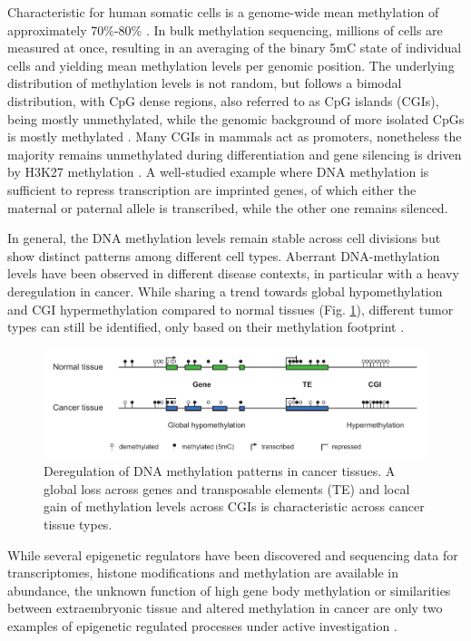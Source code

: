 Characteristic for human somatic cells is a genome-wide mean methylation of approximately 70\%-80\% \cite{Bird2002}.
In bulk methylation sequencing, millions of cells are measured at once, resulting in an averaging of the binary 5mC state of individual cells and yielding mean methylation levels per genomic position.
The underlying distribution of methylation levels is not random, but follows a bimodal distribution, with CpG dense regions, also referred to as CpG islands (CGIs), being mostly unmethylated, while the genomic background of more isolated CpGs is mostly methylated \cite{Bird2002}.
Many CGIs in mammals act as promoters, nonetheless the majority remains unmethylated during differentiation and gene silencing is driven by H3K27 methylation \cite{Larsen1992, Greenberg2019}.
A well-studied example where DNA methylation is sufficient to repress transcription are imprinted genes, of which either the maternal or paternal allele is transcribed, while the other one remains silenced.

In general, the DNA methylation levels remain stable across cell divisions but show distinct patterns among different cell types. 
Aberrant DNA-methylation levels have been observed in different disease contexts, in particular with a heavy deregulation in cancer. 
While sharing a trend towards global hypomethylation and CGI hypermethylation compared to normal tissues (Fig. \ref{fig:intro:cancer}), different tumor types can still be identified, only based on their methylation footprint \cite{Capper2018}.

\begin{figure}[h]
	\centering
	\includegraphics[width=1.0\textwidth]{figures/intro/cancer.pdf}
	\captionsetup{format=plain}
	\caption[DNA methylation in cancer]{Deregulation of DNA methylation patterns in cancer tissues. A global loss across genes and transposable elements (TE) and local gain of methylation levels across CGIs is characteristic across cancer tissue types.}
	\label{fig:intro:cancer}
\end{figure}

While several epigenetic regulators have been discovered and sequencing data for transcriptomes, histone modifications and methylation are available in abundance, the unknown function of high gene body methylation or similarities between extraembryonic tissue and altered methylation in cancer are only two examples of epigenetic regulated processes under active investigation \cite{McGuire2020}.




